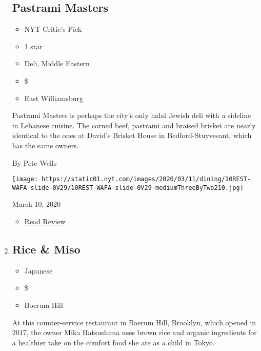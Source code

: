 \begin{enumerate}
{  \subsection{Pastrami Masters}\label{pastrami-masters}}

  \begin{itemize}
  \tightlist
  \item
    NYT Critic's Pick
  \item
     1 star
  \item
    Deli, Middle Eastern
  \item
    \$
  \item
    East Williamsburg
  \end{itemize}

  Pastrami Masters is perhaps the city's only halal Jewish deli with a
  sideline in Lebanese cuisine. The corned beef, pastrami and braised
  brisket are nearly identical to the ones at David's Brisket House in
  Bedford-Stuyvesant, which has the same owners.

  By Pete Wells

  \texttt{[image: https://static01.nyt.com/images/2020/03/11/dining/10REST-WAFA-slide-0V29/10REST-WAFA-slide-0V29-mediumThreeByTwo210.jpg]}

  March 10, 2020

  \begin{itemize}
  \tightlist
  \item
    \href{https://www.nytimes.com/2020/03/10/dining/pastrami-masters-review-pete-wells.html?rref=collection\%2Fcollection\%2Frestaurant-guide}{Read
    Review}
  \end{itemize}
\item
  \href{https://www.nytimes.com/2020/03/05/dining/rice-and-miso-review-onigiri.html}{}

  \hypertarget{rice--miso}{%
  \subsection{Rice \& Miso}\label{rice--miso}}

  \begin{itemize}
  \tightlist
  \item
    Japanese
  \item
    \$
  \item
    Boerum Hill
  \end{itemize}

  At this counter-service restaurant in Boerum Hill, Brooklyn, which
  opened in 2017, the owner Mika Hatsushima uses brown rice and organic
  ingredients for a healthier take on the comfort food she ate as a
  child in Tokyo.


\end{enumerate}
